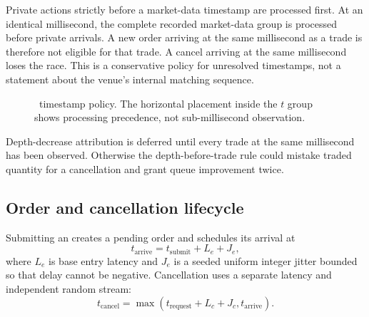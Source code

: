 Private actions strictly before a market-data timestamp are processed first.
At an identical millisecond, the complete recorded market-data group is
processed before private arrivals. A new order arriving at the same millisecond
as a trade is therefore not eligible for that trade. A cancel arriving at the
same millisecond loses the race. This is a conservative policy for unresolved
timestamps, not a statement about the venue's internal matching sequence.

\begin{figure}[H]
\centering
{}
\caption{\CurrentModel\ timestamp policy. The horizontal placement inside
the $t$ group shows processing precedence, not sub-millisecond observation.}
\label{fig:timestamp-policy}
\end{figure}

Depth-decrease attribution is deferred until every trade at the same
millisecond has been observed. Otherwise the depth-before-trade rule could
mistake traded quantity for a cancellation and grant queue improvement twice.

\subsection{Order and cancellation lifecycle}

Submitting an  creates a pending order and schedules its
arrival at
\begin{equation}
  t_{\mathrm{arrive}} = t_{\mathrm{submit}} + L_e + J_e,
\end{equation}
where $L_e$ is base entry latency and $J_e$ is a seeded uniform integer jitter
bounded so that delay cannot be negative. Cancellation uses a separate latency
and independent random stream:
\begin{equation}
  t_{\mathrm{cancel}} = \max\left(t_{\mathrm{request}} + L_c + J_c,
  t_{\mathrm{arrive}}\right).
\end{equation}

